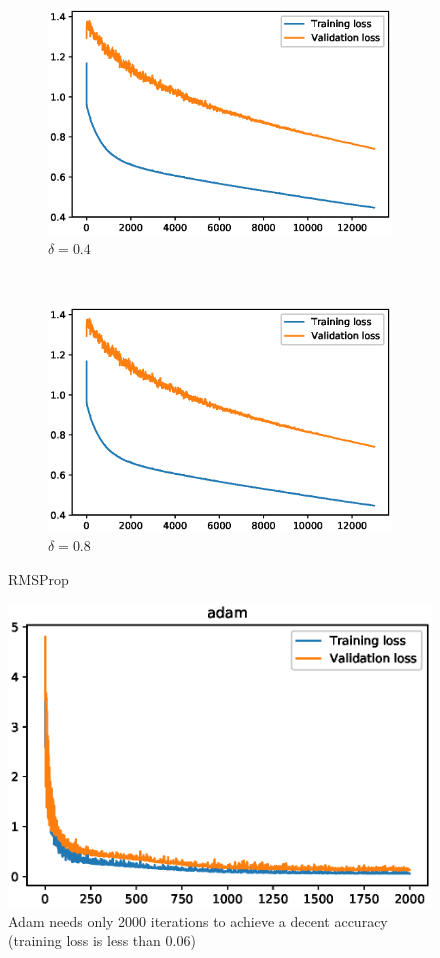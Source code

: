 \documentclass{article}
\begin{document}
\begin{figure}
\centering
\begin{subfigure}{0.45\textwidth}
\includegraphics[width=\linewidth]{loss_decrease_rms_0.4.eps}	
\caption{$\delta=0.4$}
\end{subfigure}
~
\begin{subfigure}{0.45\textwidth}
\includegraphics[width=\linewidth]{loss_decrease_rms_0.8.eps}	
\caption{$\delta=0.8$}
\end{subfigure}
\caption{RMSProp}
\end{figure}

\begin{figure}
	\includegraphics{loss_decrease_adam.eps}
	\caption{Adam needs only 2000 iterations to achieve a decent accuracy (training loss is less than 0.06)}
\end{figure}
\end{document}
